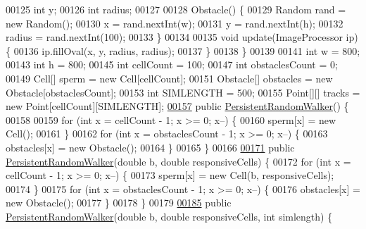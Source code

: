 \begin{DoxyCode}
{00125     \textcolor{keywordtype}{int} y;
00126     \textcolor{keywordtype}{int} radius;
00127 
00128     Obstacle() \{
00129       Random rand = \textcolor{keyword}{new} Random();
00130       x = rand.nextInt(w);
00131       y = rand.nextInt(h);
00132       radius = rand.nextInt(100);
00133     \}
00134 
00135     \textcolor{keywordtype}{void} update(ImageProcessor ip) \{
00136       ip.fillOval(x, y, radius, radius);
00137     \}
00138   \}
00139 
00141   \textcolor{keywordtype}{int} w = 800;
00143   \textcolor{keywordtype}{int} h = 800;
00145   \textcolor{keywordtype}{int} cellCount = 100;
00147   \textcolor{keywordtype}{int} obstaclesCount = 0;
00149   Cell[] sperm = \textcolor{keyword}{new} Cell[cellCount];
00151   Obstacle[] obstacles = \textcolor{keyword}{new} Obstacle[obstaclesCount];
00153   \textcolor{keywordtype}{int} SIMLENGTH = 500;
00155   Point[][] tracks = \textcolor{keyword}{new} Point[cellCount][SIMLENGTH];
\hypertarget{_persistent_random_walker_8java_source_l00157}{}\hyperlink{classdata_1_1_persistent_random_walker_ad49e0fa12d71d15eb1090e4e77c9f197}{00157}   \textcolor{keyword}{public} \hyperlink{classdata_1_1_persistent_random_walker_ad49e0fa12d71d15eb1090e4e77c9f197}{PersistentRandomWalker}() \{
00158 
00159     \textcolor{keywordflow}{for} (\textcolor{keywordtype}{int} x = cellCount - 1; x >= 0; x--) \{
00160       sperm[x] = \textcolor{keyword}{new} Cell();
00161     \}
00162     \textcolor{keywordflow}{for} (\textcolor{keywordtype}{int} x = obstaclesCount - 1; x >= 0; x--) \{
00163       obstacles[x] = \textcolor{keyword}{new} Obstacle();
00164     \}
00165   \}
00166 
\hypertarget{_persistent_random_walker_8java_source_l00171}{}\hyperlink{classdata_1_1_persistent_random_walker_a418219e73f9dc7ff97094ab05696dfa4}{00171}   \textcolor{keyword}{public} \hyperlink{classdata_1_1_persistent_random_walker_a418219e73f9dc7ff97094ab05696dfa4}{PersistentRandomWalker}(\textcolor{keywordtype}{double} b, \textcolor{keywordtype}{double} responsiveCells) \{
00172     \textcolor{keywordflow}{for} (\textcolor{keywordtype}{int} x = cellCount - 1; x >= 0; x--) \{
00173       sperm[x] = \textcolor{keyword}{new} Cell(b, responsiveCells);
00174     \}
00175     \textcolor{keywordflow}{for} (\textcolor{keywordtype}{int} x = obstaclesCount - 1; x >= 0; x--) \{
00176       obstacles[x] = \textcolor{keyword}{new} Obstacle();
00177     \}
00178   \}
00179 
\hypertarget{_persistent_random_walker_8java_source_l00185}{}\hyperlink{classdata_1_1_persistent_random_walker_ac0ac741c0140dfde5216dfd1f9c7d4d2}{00185}   \textcolor{keyword}{public} \hyperlink{classdata_1_1_persistent_random_walker_ac0ac741c0140dfde5216dfd1f9c7d4d2}{PersistentRandomWalker}(\textcolor{keywordtype}{double} b, \textcolor{keywordtype}{double} responsiveCells, \textcolor{keywordtype}{int} simlength) \{
}
\end{DoxyCode}
